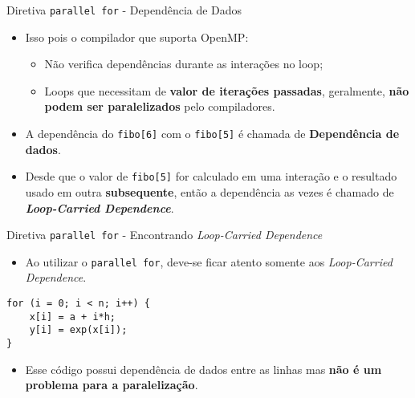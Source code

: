 \begin{frame}[fragile]{Diretiva {\tt parallel for}  - Dependência de Dados}
	\begin{itemize}
	    \setlength\itemsep{1.1em}
		\item Isso pois o compilador que suporta OpenMP:
		\begin{itemize}
	    \setlength\itemsep{0.8em}
			\item Não verifica dependências durante as interações no loop;
			\item Loops que necessitam de {\bf valor de iterações passadas}, geralmente, {\bf não podem ser paralelizados} pelo compiladores.
		\end{itemize}
		\item A dependência do {\tt fibo[6]} com o {\tt fibo[5]} é chamada de {\bf Dependência de dados}.
		\item Desde que o valor de {\tt fibo[5]} for calculado em uma interação e o resultado usado em outra {\bf subsequente}, então a dependência as vezes é chamado de {\bf \textit{Loop-Carried Dependence}}.
	\end{itemize}
\end{frame}



\begin{frame}[fragile]{Diretiva {\tt parallel for} - Encontrando \textit{Loop-Carried Dependence}}
	\begin{itemize}
		\item Ao utilizar o {\tt parallel for}, deve-se ficar atento somente aos \textit{Loop-Carried Dependence}.
	\end{itemize}

		\bigskip

	\begin{lstlisting}
for (i = 0; i < n; i++) {
	x[i] = a + i*h;
	y[i] = exp(x[i]);
}
	\end{lstlisting}

		\pause

	\begin{itemize}
		\item Esse código possui dependência de dados entre as linhas mas {\bf não é um problema para a paralelização}.
	\end{itemize}

\end{frame}





